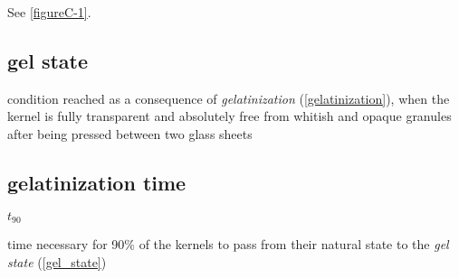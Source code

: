 \begin{note}
  See \ref{figureC-1}.
\end{note}

\begin{source}
\end{source}

\subsection*{gel state}
\label{gel_state}
condition reached as a consequence of \textit{gelatinization} (\ref{gelatinization}), when the kernel is fully transparent and absolutely free from whitish and opaque granules after being pressed between two glass sheets

\begin{source}
\end{source}

\subsection*{gelatinization time}
$t_90$

time necessary for 90\% of the kernels to pass from their natural state to the \textit{gel state} (\ref{gel_state})

\begin{source}
\end{source}
